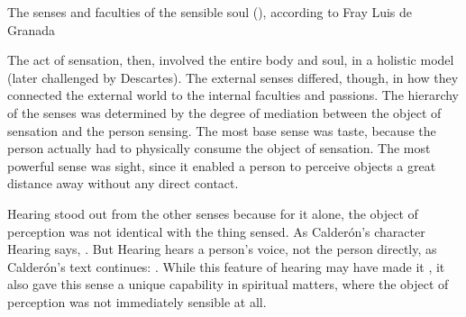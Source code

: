 
{The senses and faculties of the sensible soul (),
according to Fray Luis de Granada}

The act of sensation, then, involved the entire body and soul, in a holistic
model (later challenged by Descartes).
The external senses differed, though, in how they connected the external world
to the internal faculties and passions.
The hierarchy of the senses was determined by the degree of mediation between
the object of sensation and the person sensing.
The most base sense was taste, because the person actually had to physically
consume the object of sensation.
The most powerful sense was sight, since it enabled a person to perceive objects
a great distance away without any direct contact.


Hearing stood out from the other senses because for it alone, the object of
perception was not identical with the thing sensed.
As Calderón's character Hearing says, .%
    \Autocite[]{Calderon:Retiro}
But Hearing hears a person's voice, not the person directly, as Calderón's text
continues: .%
    \Autocite[]{Calderon:Retiro}
While this feature of hearing may have made it , it also
gave this sense a unique capability in spiritual matters, where the object of
perception was not immediately sensible at all.

